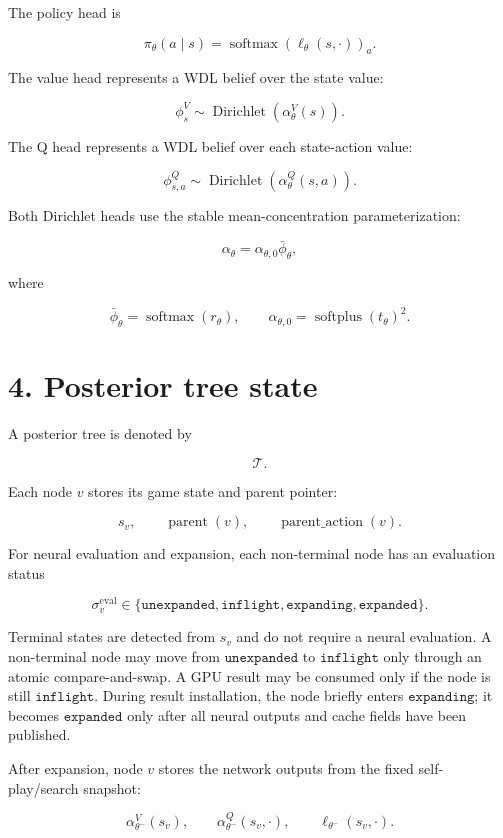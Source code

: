 \documentclass[11pt]{article}
\newcommand{\Dir}{\operatorname{Dirichlet}}
\newcommand{\softmax}{\operatorname{softmax}}
\newcommand{\softplus}{\operatorname{softplus}}
\newcommand{\Tree}{\mathcal{T}}
\begin{document}
The policy head is

\[
\pi_\theta(a \mid s)
=
\softmax(\ell_\theta(s,\cdot))_a.
\]

The value head represents a WDL belief over the state value:

\[
\phi_s^V
\sim
\Dir(\alpha_\theta^V(s)).
\]

The Q head represents a WDL belief over each state-action value:

\[
\phi_{s,a}^Q
\sim
\Dir(\alpha_\theta^Q(s,a)).
\]

Both Dirichlet heads use the stable mean-concentration parameterization:

\[
\alpha_\theta
=
\alpha_{\theta,0}\bar{\phi}_\theta,
\]

where

\[
\bar{\phi}_\theta = \softmax(r_\theta),
\qquad
\alpha_{\theta,0} = \softplus(t_\theta)^2.
\]


\section*{4. Posterior tree state}

A posterior tree is denoted by

\[
\Tree.
\]

Each node \(v\) stores its game state and parent pointer:

\[
s_v,
\qquad
\operatorname{parent}(v),
\qquad
\operatorname{parent\_action}(v).
\]

For neural evaluation and expansion, each non-terminal node has an evaluation
status

\[
\sigma^{\mathrm{eval}}_v
\in
\{\texttt{unexpanded},\texttt{inflight},\texttt{expanding},\texttt{expanded}\}.
\]

Terminal states are detected from \(s_v\) and do not require a neural evaluation.
A non-terminal node may move from \(\texttt{unexpanded}\) to
\(\texttt{inflight}\) only through an atomic compare-and-swap. A GPU result may
be consumed only if the node is still \(\texttt{inflight}\). During result
installation, the node briefly enters \(\texttt{expanding}\); it becomes
\(\texttt{expanded}\) only after all neural outputs and cache fields have been
published.

After expansion, node \(v\) stores the network outputs from the fixed
self-play/search snapshot:

\[
\alpha_{\theta^-}^V(s_v),
\qquad
\alpha_{\theta^-}^Q(s_v,\cdot),
\qquad
\ell_{\theta^-}(s_v,\cdot).
\]
\end{document}
